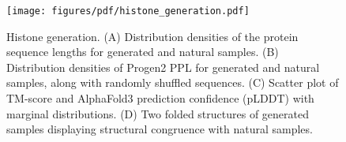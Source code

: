 \begin{figure}[!htb]
    \centering
    \texttt{[image: figures/pdf/histone\_generation.pdf]}
    \caption{Histone generation. (A) Distribution densities of the protein sequence lengths for generated and natural samples. (B) Distribution densities of Progen2 PPL for generated and natural samples, along with randomly shuffled sequences. (C) Scatter plot of TM-score and AlphaFold3 prediction confidence (pLDDT) with marginal distributions. (D) Two folded structures of generated samples displaying structural congruence with natural samples.}
    \label{fig:histone_generation}
\end{figure}